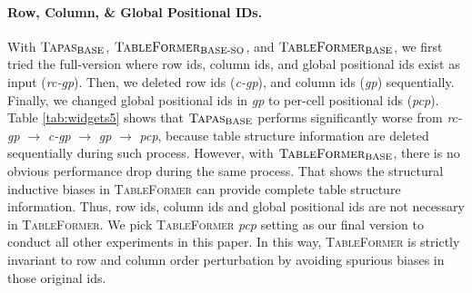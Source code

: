 \documentclass[11pt]{article}
\begin{document}
\paragraph{Row, Column, \& Global Positional IDs.} With $\textsc{Tapas}_{\text{BASE}}$, $\textsc{TableFormer}_{\text{BASE-SO}}$, and $\textsc{TableFormer}_{\text{BASE}}$, we first tried the full-version where row ids, column ids, and global positional ids exist as input (\textit{rc-gp}). Then, we deleted row ids (\textit{c-gp}), and column ids (\textit{gp}) sequentially. Finally, we changed global positional ids in \textit{gp} to per-cell positional ids (\textit{pcp}). Table \ref{tab:widgets5} shows that  $\textsc{Tapas}_{\text{BASE}}$ performs significantly worse from \textit{rc-gp} $\rightarrow$ \textit{c-gp} $\rightarrow$ \textit{gp} $\rightarrow$ \textit{pcp}, because table structure information are deleted sequentially during such process. However, with $\textsc{TableFormer}_{\text{BASE}}$, there is no obvious performance drop during the same process. That shows the structural inductive biases in \textsc{TableFormer} can provide complete table structure information. Thus, row ids, column ids and global positional ids are not necessary in \textsc{TableFormer}. We pick \textsc{TableFormer} \textit{pcp} setting as our final version to conduct all other experiments in this paper. In this way, \textsc{TableFormer} is strictly invariant to row and column order perturbation by avoiding spurious biases in those original ids.
\end{document}
